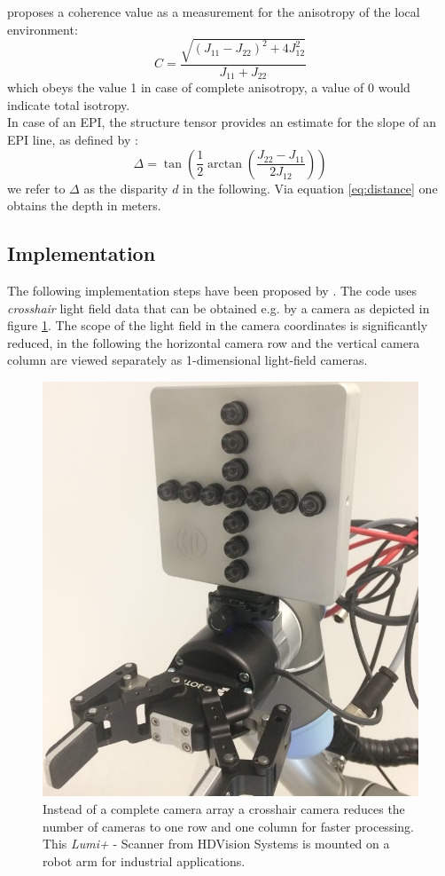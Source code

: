 \documentclass  [
  paper    = a4,
  BCOR     = 10mm,
  twoside,
  fontsize = 12pt,
  fleqn,
  toc      = bibnumbered,
  toc      = listofnumbered,
  numbers  = noendperiod,
  headings = normal,
  listof   = leveldown,
  version  = 3.03
]                                       {scrreprt}
\begin{document}
   \cite{jahne2013digitale} proposes a coherence value as a measurement for the anisotropy of the local environment:
 \begin{equation}\label{eq:coherence}
 C = \frac{\sqrt{(J_{11} - J_{22})^2 + 4J_{12}^2}}{J_{11} + J_{22}}
 \end{equation}
 which obeys the value 1 in case of complete anisotropy, a value of 0 would indicate total isotropy.\\
 In case of an EPI, the structure tensor provides an estimate for the slope of an EPI line, as defined by \cite{bigun1987optimal}:
 \begin{equation}\label{eq:disparity}
 \Delta = \tan\left(\frac{1}{2} \arctan\left( \frac{J_{22}-J_{11}}{2J_{12}}\right)\right)
 \end{equation}
 we refer to $\Delta$ as the disparity $d$ in the following. Via equation \ref{eq:distance} one obtains the depth in meters.
 
 \subsection{Implementation}
 The following implementation steps have been proposed by \cite{wanner2014orientation}. The code uses \textit{crosshair} light field data that can be obtained e.g. by a camera as depicted in figure \ref{fig:lumiplus}. The scope of the light field in the camera coordinates is significantly reduced, in the following the horizontal camera row and the vertical camera column are viewed separately as 1-dimensional light-field cameras.\\
 \begin{figure}[h!]
 	\centering
 	\includegraphics[width=0.5\linewidth]{images/Lumiplus}
 	\caption[LumiPlus Scanner from HDVision Systems]{Instead of a complete camera array a crosshair camera reduces the number of cameras to one row and one column for faster processing. This \textit{Lumi+} - Scanner from HDVision Systems is mounted on a robot arm for industrial applications.}
 	\label{fig:lumiplus}
 \end{figure}
 
\end{document}
